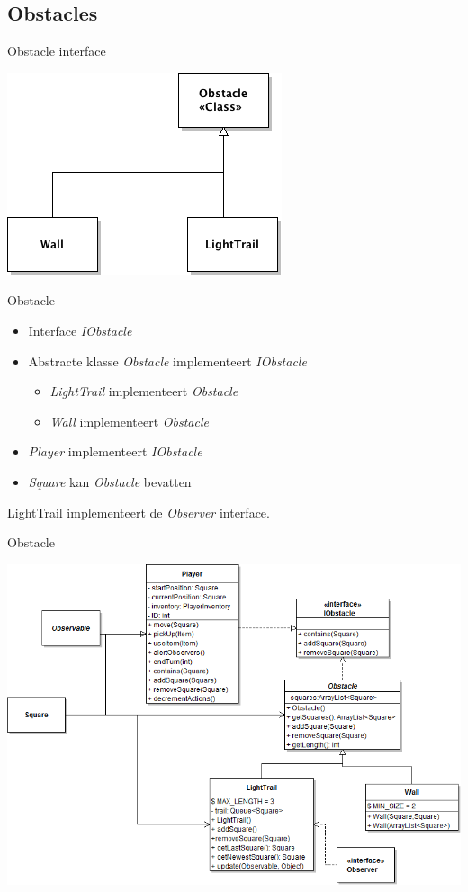 \documentclass[t]{beamer}
\begin{document}
\subsection{Obstacles}
\begin{frame}{Obstacle interface}
\begin{center}
\includegraphics[width=0.50\linewidth]{images/obstacleinterface}
\end{center}
\end{frame}

\begin{frame}{Obstacle}
\begin{center}
\begin{itemize}
	\item Interface \textit{IObstacle}
	\item  Abstracte klasse \textit{Obstacle} implementeert \textit{IObstacle}
	\begin{itemize}
		\item \textit{LightTrail} implementeert \textit{Obstacle}
		\item \textit{Wall} implementeert \textit{Obstacle}
	\end{itemize}
	\item \textit{Player} implementeert \textit{IObstacle}
	\item \textit{Square} kan \textit{Obstacle} bevatten
\end{itemize}
LightTrail implementeert de \textit{Observer} interface.
\end{center}
\end{frame}


\begin{frame}{Obstacle}
\begin{center}
\includegraphics[width=0.70\linewidth]{images/obstacleObserverClassDiagram}
\end{center}
\end{frame}
\end{document}
